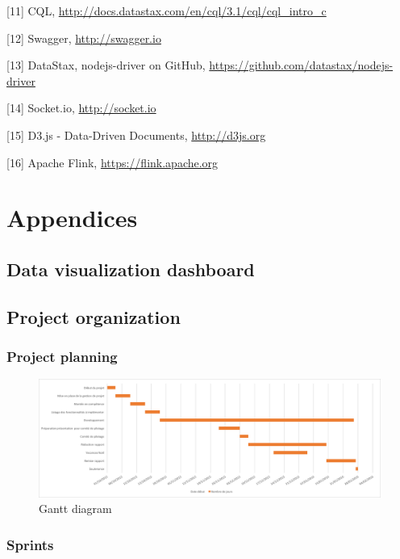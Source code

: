 \documentclass[11pt]{article}
\begin{document}
[11] CQL, \url{http://docs.datastax.com/en/cql/3.1/cql/cql_intro_c}
\vspace{1pt}

[12] Swagger, \url{http://swagger.io}
\vspace{1pt}

[13] DataStax, nodejs-driver on GitHub, \url{https://github.com/datastax/nodejs-driver}
\vspace{1pt}

[14] Socket.io, \url{http://socket.io}
\vspace{1pt}

[15] D3.js - Data-Driven Documents, \url{http://d3js.org}
\vspace{1pt}

[16] Apache Flink, \url{https://flink.apache.org}

\newpage
{}
\section{Appendices}

\subsection{Data visualization dashboard}

\subsection{Project organization}

\subsubsection{Project planning}

\begin{figure}[h!]
    \centering
    \includegraphics[scale=0.5]{img/gantt.png}
    \caption{Gantt diagram}
    \label{gantt}
\end{figure}

\subsubsection{Sprints}
\end{document}
